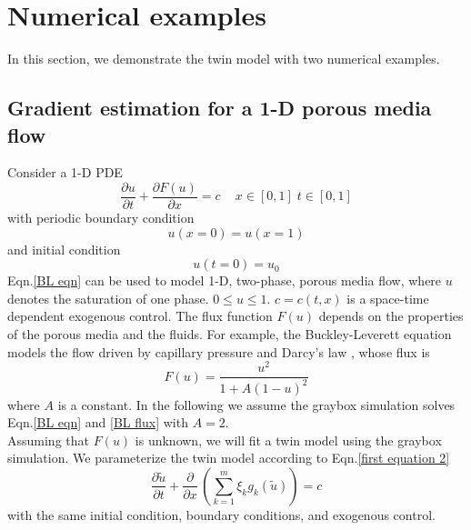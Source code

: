 \documentclass[a4paper,onecolumn]{article}
\theoremstyle{remark}
\begin{document}
\section{Numerical examples}
\label{numerical example}
In this section, we demonstrate the twin model with two numerical examples.
\subsection{Gradient estimation for a 1-D porous media flow}
Consider a 1-D PDE
\begin{equation}
    \frac{\partial u}{\partial t} + \frac{\partial F(u)}{\partial x} = c\,\quad x\in[0,1]\; t\in[0,1]
    \label{BL eqn}
\end{equation}
with periodic boundary condition
\begin{equation}
    u(x=0) = u(x=1)
\end{equation}
and initial condition
\begin{equation}
    u(t=0) = u_0
\end{equation}
Eqn.\eqref{BL eqn} can be used to model 1-D, two-phase, porous media flow, where $u$
denotes the saturation of one phase. $0\le u\le 1$. $c=c(t,x)$ is a space-time dependent exogenous control.
The flux function $F(u)$ depends on the properties of the porous media and the fluids.
For example, the Buckley-Leverett equation models the flow driven by 
capillary pressure and Darcy's law \cite{Buckley Leverett}, whose flux is
\begin{equation}
    F(u) = \frac{u^2}{1+A(1-u)^2}
    \label{BL flux}
\end{equation}
where $A$ is a constant. In the following we assume the graybox simulation
solves Eqn.\eqref{BL eqn} and \eqref{BL flux} with $A=2$.
\\

\indent Assuming that $F(u)$ is unknown, we will fit a twin model 
using the graybox simulation.
We parameterize the twin model according to Eqn.\eqref{first equation 2}
\begin{equation}
    \frac{\partial \tilde{u}}{\partial t} + \frac{\partial}{\partial x}\,
    \left(\sum_{k=1}^m \xi_k g_{k}(\tilde{u})\right) = c
    \label{twin model 3}
\end{equation}
with the same initial condition, boundary conditions, and exogenous control. 
\end{document}
